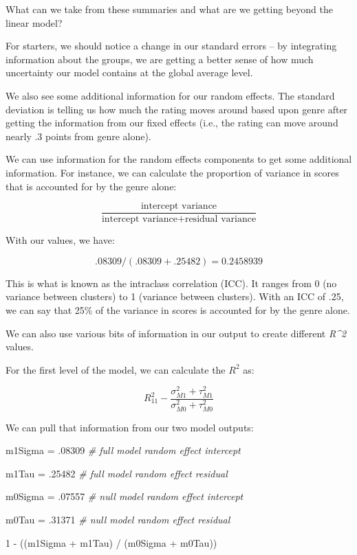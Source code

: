 \documentclass[
  letterpaper,
]{krantz}
\newenvironment{Shaded}{}{}
\newcommand{\CommentTok}[1]{\textcolor[rgb]{0.38,0.63,0.69}{\textit{#1}}}
\newcommand{\DecValTok}[1]{\textcolor[rgb]{0.25,0.63,0.44}{#1}}
\newcommand{\NormalTok}[1]{#1}
\newcommand{\OtherTok}[1]{\textcolor[rgb]{0.00,0.44,0.13}{#1}}
\newcommand{\SpecialCharTok}[1]{\textcolor[rgb]{0.25,0.44,0.63}{#1}}
\begin{document}
What can we take from these summaries and what are we getting beyond the
linear model?

For starters, we should notice a change in our standard errors -- by
integrating information about the groups, we are getting a better sense
of how much uncertainty our model contains at the global average level.

We also see some additional information for our random effects. The
standard deviation is telling us how much the rating moves around based
upon genre after getting the information from our fixed effects (i.e.,
the rating can move around nearly .3 points from genre alone).

We can use information for the random effects components to get some
additional information. For instance, we can calculate the proportion of
variance in scores that is accounted for by the genre alone:

\[\frac{\text{intercept variance}}{\text{intercept variance} + \text{residual variance}}\]

With our values, we have:

\[
.08309 / (.08309 + .25482) = 0.2458939
\]

This is what is known as the intraclass correlation (ICC). It ranges
from 0 (no variance between clusters) to 1 (variance between clusters).
With an ICC of .25, we can say that 25\% of the variance in scores is
accounted for by the genre alone.

We can also use various bits of information in our output to create
different \emph{R\^{}2} values.

For the first level of the model, we can calculate the \(R^2\) as:

\[R^2_11 - \frac{\sigma^2_{M1} + \tau^2_{M1}}{\sigma^2_{M0} + \tau^2_{M0}}\]

We can pull that information from our two model outputs:

\begin{Shaded}
\begin{Highlighting}[]
\NormalTok{m1Sigma }\OtherTok{=}\NormalTok{ .}\DecValTok{08309} \CommentTok{\# full model random effect intercept}

\NormalTok{m1Tau }\OtherTok{=}\NormalTok{ .}\DecValTok{25482} \CommentTok{\# full model random effect residual}

\NormalTok{m0Sigma }\OtherTok{=}\NormalTok{ .}\DecValTok{07557} \CommentTok{\# null model random effect intercept}

\NormalTok{m0Tau }\OtherTok{=}\NormalTok{ .}\DecValTok{31371} \CommentTok{\# null model random effect residual}

\DecValTok{1} \SpecialCharTok{{-}}\NormalTok{ ((m1Sigma }\SpecialCharTok{+}\NormalTok{ m1Tau) }\SpecialCharTok{/}\NormalTok{ (m0Sigma }\SpecialCharTok{+}\NormalTok{ m0Tau))}
\end{Highlighting}
\end{Shaded}
\end{document}
